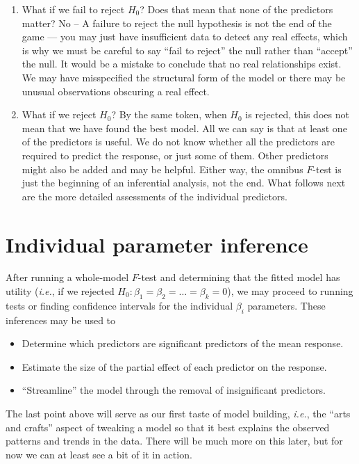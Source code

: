 \documentclass[
]{book}
\providecommand{\tightlist}{%
  \setlength{\itemsep}{0pt}\setlength{\parskip}{0pt}}
\begin{document}
\begin{enumerate}
\def\labelenumi{\arabic{enumi}.}
\item
  What if we fail to reject \(H_0\)? Does that mean that none of the predictors matter? No -- A failure to reject the null hypothesis is not the end of the game --- you may just have insufficient data to detect any real effects, which is why we must be careful to say ``fail to reject'' the null rather than ``accept'' the null. It would be a mistake to conclude that no real relationships exist. We may have misspecified the structural form of the model or there may be unusual observations obscuring a real effect.
\item
  What if we reject \(H_0\)? By the same token, when \(H_0\) is rejected, this does not mean that we have found the best model. All we can say is that at least one of the predictors is useful. We do not know whether all the predictors are required to predict the response, or just some of them. Other predictors might also be added and may be helpful. Either way, the omnibus \(F\)-test is just the beginning of an inferential analysis, not the end. What follows next are the more detailed assessments of the individual predictors.
\end{enumerate}

\hypertarget{individual-parameter-inference}{%
\section{Individual parameter inference}\label{individual-parameter-inference}}

After running a whole-model \(F\)-test and determining that the fitted model has utility (\emph{i.e.}, if we rejected \(H_0: \beta_1 = \beta_2 = \ldots = \beta_k = 0\)), we may proceed to running tests or finding confidence intervals for the individual \(\beta_i\) parameters.
These inferences may be used to

\begin{itemize}
\tightlist
\item
  Determine which predictors are significant predictors of the mean response.
\item
  Estimate the size of the partial effect of each predictor on the response.
\item
  ``Streamline'' the model through the removal of insignificant predictors.
\end{itemize}

The last point above will serve as our first taste of model building, \emph{i.e.}, the ``arts and crafts'' aspect of tweaking a model so that it best explains the observed patterns and trends in the data.
There will be much more on this later, but for now we can at least see a bit of it in action.
\end{document}
